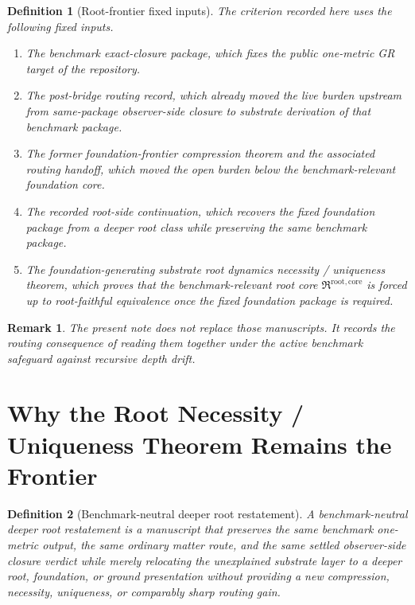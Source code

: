 \documentclass[11pt]{article}
\newcommand{\RootCore}{\mathfrak R^{\mathrm{root,core}}}
\newtheorem{definition}{Definition}
\newtheorem{remark}{Remark}
\begin{document}
\begin{definition}[Root-frontier fixed inputs]
The criterion recorded here uses the following fixed inputs.
\begin{enumerate}
    \item The benchmark exact-closure package, which fixes the public one-metric GR target of the repository.
    \item The post-bridge routing record, which already moved the live burden upstream from same-package observer-side closure to substrate derivation of that benchmark package.
    \item The former foundation-frontier compression theorem and the associated routing handoff, which moved the open burden below the benchmark-relevant foundation core.
    \item The recorded root-side continuation, which recovers the fixed foundation package from a deeper root class while preserving the same benchmark package.
    \item The foundation-generating substrate root dynamics necessity / uniqueness theorem, which proves that the benchmark-relevant root core \(\RootCore\) is forced up to root-faithful equivalence once the fixed foundation package is required.
\end{enumerate}
\end{definition}

\begin{remark}
The present note does not replace those manuscripts. It records the routing consequence of reading them together under the active benchmark safeguard against recursive depth drift.
\end{remark}

\section{Why the Root Necessity / Uniqueness Theorem Remains the Frontier}

\begin{definition}[Benchmark-neutral deeper root restatement]
A \emph{benchmark-neutral deeper root restatement} is a manuscript that preserves the same benchmark one-metric output, the same ordinary matter route, and the same settled observer-side closure verdict while merely relocating the unexplained substrate layer to a deeper root, foundation, or ground presentation without providing a new compression, necessity, uniqueness, or comparably sharp routing gain.
\end{definition}
\end{document}
